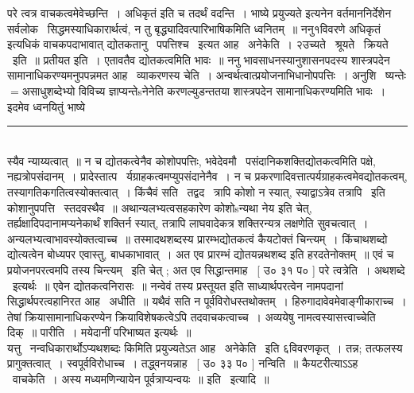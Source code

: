 \documentclass[11pt, openany]{book}
\begin{document}
\begin{multicols}{2}
परे त्वत्र वाचकत्वमेवेच्छन्ति~। {\qt अधिकृतं} इति च तदर्थं वदन्ति~। भाष्ये {\qt प्रयुज्यते} इत्यनेन वर्तमाननिर्देशेन सर्वलोक \textendash\ सिद्धमस्याधिकारार्थत्वं, न तु बृद्ध्यादिवत्पारिभाषिकमिति ध्वनितम्~॥ ननु१विवरणे {\qt अधिकृतं} इत्यधिकं वाचकपदाभावात् द्योतकतानु \textendash\ पपत्तिश्च \textendash\ इत्यत आह \textendash\ अनेकेति~। २उच्यते \textendash\ श्रूयते \textendash\ क्रियते \textendash\ इति~॥ प्रतीयत इति~। एतावतैव द्योतकत्वमिति भावः~॥ ननु भावसाधनस्यानुशासनपदस्य शास्त्रपदेन सामानाधिकरण्यमनुपपन्नमत आह \textendash\ व्याकरणस्य चेति~। अन्वर्थत्वात्प्रयोजनाभिधानोपपत्तिः~। अनुशि \textendash\ ष्यन्तेः$=$असाधुशब्देभ्यो विविच्य ज्ञाप्यन्तेsनेनेति करणल्युडन्ततया शास्त्रपदेन सामानाधिकरण्यमिति भावः~। इदमेव ध्वनयितुं भाष्ये

\noindent
\rule{1\linewidth}{0.5pt}\\

\noindent
स्यैव न्याय्यत्वात्~॥ न च द्योतकत्वेनैव कोशोपपत्तिः, भवेदेवमौ \textendash\ पसंदानिकशक्तिद्योतकत्वमिति पक्षे, नह्यत्रोपसंदानम्~। प्रादेस्तात्प \textendash\ र्यग्राहकत्वमप्युपसंदानेनैव~। न च प्रकरणादिवत्तात्पर्यग्राहकत्वमेवद्योतकत्वम्, तस्यागतिकगतित्वस्योक्तत्वात्~। किंचैवं सति \textendash\ तद्वद \textendash\ त्रापि कोशो न स्यात्, स्याद्वाऽत्रेव तत्रापि \textendash\ इति कोशानुपपत्ति \textendash\ स्तदवस्थैव~॥ अथान्यलभ्यत्वसहकारेण कोशोsन्यथा नेय इति चेत्, तर्ह्यक्षादिपदानामप्यनेकार्थं शक्तिर्न स्यात्, तत्रापि लाघवादेकत्र शक्तिरन्यत्र लक्षणेति सुवचत्वात्~। अन्यलभ्यत्वाभावस्योक्तत्वाच्च~॥ तस्मादथशब्दस्य प्रारम्भद्योतकत्वं कैयटोक्तं चिन्त्यम्~। किंचाथशब्दो द्योत्यत्वेन बोध्यपर एवास्तु, बाधकाभावात्~। अत एव प्रारम्भं द्योतयन्नथशब्द इति हरदतेनोक्तम्~॥ एवं च प्रयोजनपरत्वमपि तस्य चिन्त्यम् \textendash\ इति चेत् ; अत एव सिद्धान्तमाह \textendash\ [ उ० ३१ प० ] परे त्वत्रेति~। अथशब्दे \textendash\ इत्यर्थः~॥ एवेन द्योतकत्वनिरासः~॥ नन्वेवं तस्य प्रस्तूयत इति साध्यार्थपरत्वेन नामपदानां सिद्धार्थपरत्वहानिरत आह \textendash\ अधीति~॥ यथैवं सति न पूर्वविरोधस्तथोक्तम्~। हिरुगादावेवमेवाङ्गीकाराच्च~। तेषां क्रियासामानाधिकरण्येन क्रियाविशेषकत्वेऽपि तदवाचकत्वाच्च~। अव्ययेषु नामत्वस्यासत्त्वाच्चेति दिक्~॥ पारीति~। मयेदानीं परिभाष्यत इत्यर्थः~॥\\

यत्तु \textendash\ नन्वधिकारार्थोऽप्यथशब्दः किमिति प्रयुज्यतेऽत आह \textendash\ अनेकेति \textendash\ इति ६विवरणकृत्~। तन्न; तत्फलस्य प्रागुक्तत्वात्~। स्वपूर्वविरोधाच्च~। तद्ध्वनयन्नाह \textendash\ [ उ० ३३ प० ] नन्विति~॥ कैयटरीत्याऽऽह \textendash\ वाचकेति~। अस्य मध्यमणिन्यायेन पूर्वत्राप्यन्वयः~॥ इति \textendash\ इत्यादि~॥\\


\end{multicols}
\end{document}
